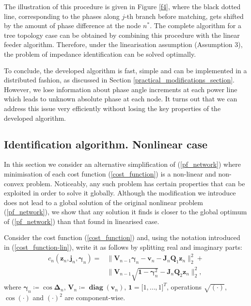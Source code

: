 \documentclass[journal,10pt,onecolumn,draftclsnofoot,]{IEEEtran}
\theoremstyle{plain}
\theoremstyle{definition}
\theoremstyle{remark}
\DeclareMathOperator{\diag}{\mathbf{diag}}
\begin{document}
\noindent The illustration of this procedure is given in Figure \ref{f4}, where the black dotted line, corresponding to the phases along $j$-th branch before matching, gets shifted by the amount of phase difference at the node $n^*$. The complete algorithm for a tree topology case can be obtained by combining this procedure with the linear feeder algorithm. Therefore, under the linearisation assumption (Assumption 3), the problem of impedance identification can be solved optimally. 

To conclude, the developed algorithm is fast, simple and can be implemented in a distributed fashion, as discussed in Section \ref{practical_modifications_section}. However, we lose information about phase angle increments at each power line which leads to unknown absolute phase at each node. It turns out that we can address this issue very efficiently without losing the key properties of the developed algorithm. 

\subsection{Identification algorithm. Nonlinear case}

In this section we consider an alternative simplification of (\ref{pf_network}) where minimisation of each cost function (\ref{cost_function}) is a non-linear and non-convex problem. Noticeably, any such problem has certain properties that can be exploited in order to solve it globally. Although the modification we introduce does not lead to a global solution of the original nonlinear problem (\ref{pf_network}), we show that any solution it finds is closer to the global optimum of (\ref{pf_network}) than that found in linearised case.

Consider the cost function (\ref{cost_function}) and, using the notation introduced in (\ref{cost_function-lin}), write it as follows by splitting real and imaginary parts:
\begin{equation}
\begin{split}
c_n(\bm{z}_{n}, \bm{j}_n, \bm{\gamma}_{n}) ={}& \Big\| \bm{V}_{n-1}\bm{\gamma}_{n} - \bm{v}_{n} - \bm{J}_{n}\bm{Q}_1\bm{z}_{n} \Big\|_2^2 + \\
& \Big\|\bm{V}_{n-1}\sqrt{\bm{1} - \bm{\gamma}^2_{n}} - \bm{J}_{n}\bm{Q}_2\bm{z}_{n} \Big\|_2^2,
\end{split}
\label{cost_function-nlin}
\end{equation}
where $\bm{\gamma}_n \coloneqq \cos{\bm{\Delta}_{n}}$, $\bm{V}_n \coloneqq \diag{(\bm{v}_{n})}$, $\bm{1} = \big[1, \ldots, 1 \big]^T$, operations $\sqrt{(\cdot)}$, $\cos{(\cdot)}$ and $(\cdot)^2$ are component-wise. 
\end{document}
